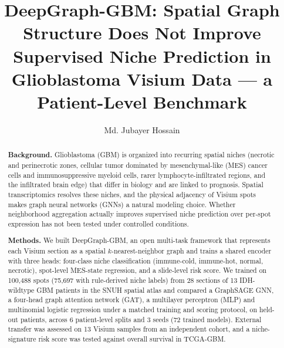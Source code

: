 \documentclass[11pt,letterpaper]{article}
\title{\vspace{-1.5em}\bfseries DeepGraph-GBM: Spatial Graph Structure Does Not Improve Supervised Niche Prediction in Glioblastoma Visium Data --- a Patient-Level Benchmark}
\author[1,2,*]{Md. Jubayer Hossain}
\affil[1]{Center for Health Innovation, Research, Action, and Learning - Bangladesh}
\affil[2]{DeepBio}
\affil[*]{Corresponding author: \texttt{hossainmj.me@gmail.com}}
\date{}
\begin{document}
\maketitle
\thispagestyle{fancy}

\begin{abstract}
\small
\noindent\textbf{Background.} Glioblastoma (GBM) is organized into recurring spatial niches (necrotic and perinecrotic zones, cellular tumor dominated by mesenchymal-like (MES) cancer cells and immunosuppressive myeloid cells, rarer lymphocyte-infiltrated regions, and the infiltrated brain edge) that differ in biology and are linked to prognosis. Spatial transcriptomics resolves these niches, and the physical adjacency of Visium spots makes graph neural networks (GNNs) a natural modeling choice. Whether neighborhood aggregation actually improves supervised niche prediction over per-spot expression has not been tested under controlled conditions.

\noindent\textbf{Methods.} We built DeepGraph-GBM, an open multi-task framework that represents each Visium section as a spatial $k$-nearest-neighbor graph and trains a shared encoder with three heads: four-class niche classification (immune-cold, immune-hot, normal, necrotic), spot-level MES-state regression, and a slide-level risk score. We trained on 100{,}488 spots (75{,}697 with rule-derived niche labels) from 28 sections of 13 IDH-wildtype GBM patients in the SNUH spatial atlas and compared a GraphSAGE GNN, a four-head graph attention network (GAT), a multilayer perceptron (MLP) and multinomial logistic regression under a matched training and scoring protocol, on held-out patients, across 6 patient-level splits and 3 seeds (72 trained models). External transfer was assessed on 13 Visium samples from an independent cohort, and a niche-signature risk score was tested against overall survival in TCGA-GBM.


\end{abstract}
\end{document}
